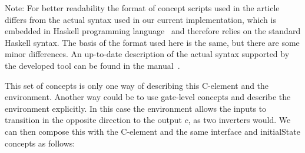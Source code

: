 \documentclass[british, journal]{IEEEtran}
\begin{document}

Note: For better readability the format of concept scripts used in the article
differs from the actual syntax used in our current implementation, which is
embedded in Haskell programming language~\cite{1996_hudak_dsl} and therefore
relies on the standard Haskell syntax. The basis of the format used here is the
same, but there are some minor differences. An up-to-date description of the
actual syntax supported by the developed tool can be found in the
manual~\cite{2016_concepts_github}.


This set of concepts is only one way of describing this C-element
and the environment. Another way could be to use gate-level concepts
and describe the environment explicitly. In this case the environment
allows the inputs to transition in the opposite direction to the output
$c$, as two inverters would. We can then compose this with the C-element
and the same \textsf{interface} and \textsf{initialState} concepts as follows:
\end{document}
